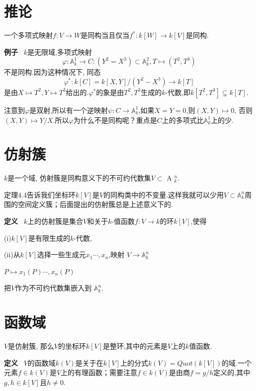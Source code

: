 \documentclass[UTF8]{book}
\begin{document}
	\section{推论}一个多项式映射$ f:V \rightarrow W $是同构当且仅当$f^{*}:k[W]\rightarrow k[V]$是同构.

		\textbf{例子} \ $  k $是无限域,多项式映射
		\begin{equation*}
		\varphi:\mathbb{A}^{1}_{k}\rightarrow C:(Y^{2}=X^{3}) \subset \mathbb{A}^{2}_{k},  T\mapsto (T^{2},T^{3})
		\end{equation*}
		不是同构.因为这种情况下, 同态
		\begin{equation*}
		\varphi^{*}:k[C]=k[X,Y]/(Y^{2}-X^{3})\rightarrow k[T]
		\end{equation*}
		是由$X\mapsto T^{2},Y\mapsto T^{3}$给出的.$\varphi^{*}$的象是由$T^{2},T^{3}$生成的$ k $-代数,即$k[T^{2},T^{3}]\subsetneq k[T]$.
		
		注意到$\varphi$是双射,所以有一个逆映射$\psi :C\rightarrow \mathbb{A}^{1}_{k}$,如果$ X=Y=0 $,则$(X,Y)\mapsto 0$, 否则$(X,Y)\mapsto Y/X$.所以$\varphi$为什么不是同构呢？重点是$ C $上的多项式比$\mathbb{A}^{1}_{k}$上的少.
	\section{仿射簇}
		$ k $是一个域, 仿射簇是同构意义下的不可约代数集$V\subset $ A $^{n}_{k}$.

		定理4.4告诉我们坐标环$ k[V] $是$ V $的同构类中的不变量.这样我就可以少用$V\subset \mathbb{A}^{n}_{k}$周围的空间定义簇；后面提出的仿射簇总是上述意义下的.

		\textbf{定义} \ $ k $上的仿射簇是集合$ V $和关于$ k $-值函数$f:V\rightarrow k$的环$ k[V] $,使得

		(i)$ k[V] $是有限生成的$ k $-代数,

		(ii)从$ k[V] $选择一些生成元$x_{1}  \cdots, x_{n}$,映射
		\center $ V \rightarrow  \mathbb{A}^{n}_{k}$


		$P\mapsto x_{1}(P)  \cdots, x_{n}(P)$

		\justifying
		把$ V $作为不可约代数集嵌入到 $ \mathbb{A} ^{n}_{k}$.
		
		
		\section{函数域}$ V $是仿射簇, 那么$ V $的坐标环$ k[V] $是整环,其中的元素是$ V $上的$ k $值函数.

		\textbf{定义} \ $ V $的函数域$ k(V) $是关于在$ k[V] $上的分式$ k(V)=Quot(k[V]) $的域.一个元素$f\in k(V)$是$ V $上的有理函数；需要注意$f\in k(V)$是由商$ f=g/h $定义的,其中$g,h\in k[V]$且$h\neq 0$.	
\end{document}
